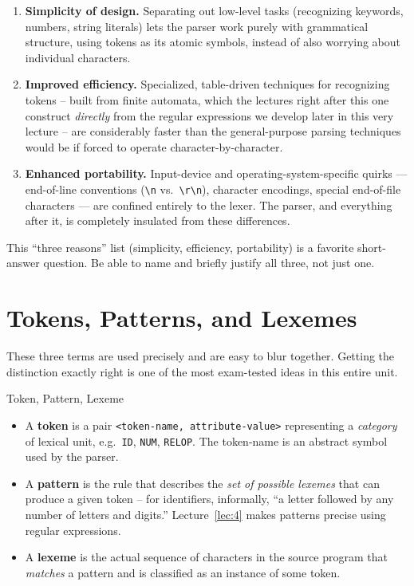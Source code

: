 \documentclass[full-course-notes.tex]{subfiles}
\begin{document}
\begin{enumerate}
  \item \textbf{Simplicity of design.} Separating out low-level tasks (recognizing keywords,
  numbers, string literals) lets the parser work purely with grammatical structure, using
  tokens as its atomic symbols, instead of also worrying about individual characters.
  \item \textbf{Improved efficiency.} Specialized, table-driven techniques for recognizing
  tokens -- built from finite automata, which the lectures right after this one construct
  \emph{directly} from the regular expressions we develop later in this very lecture -- are
  considerably faster than the general-purpose parsing techniques would be if forced to operate
  character-by-character.
  \item \textbf{Enhanced portability.} Input-device and operating-system-specific quirks ---
  end-of-line conventions (\texttt{\textbackslash n} vs.\ \texttt{\textbackslash r\textbackslash n}), character
  encodings, special end-of-file characters --- are confined entirely to the lexer. The parser,
  and everything after it, is completely insulated from these differences.
\end{enumerate}

\begin{examfocus}
This ``three reasons'' list (simplicity, efficiency, portability) is a favorite short-answer
question. Be able to name and briefly justify all three, not just one.
\end{examfocus}

\section{Tokens, Patterns, and Lexemes}
\label{sec:l3-tokens-patterns-lexemes}

\dbtag These three terms are used precisely and are easy to blur together. Getting the
distinction exactly right is one of the most exam-tested ideas in this entire unit.

\begin{defbox}{Token, Pattern, Lexeme}
\begin{itemize}
  \item A \textbf{token} is a pair \texttt{<token-name, attribute-value>} representing a
  \emph{category} of lexical unit, e.g.\ \texttt{ID}, \texttt{NUM}, \texttt{RELOP}. The
  token-name is an abstract symbol used by the parser.
  \item A \textbf{pattern} is the rule that describes the \emph{set of possible lexemes} that
  can produce a given token -- for identifiers, informally, ``a letter followed by any number of
  letters and digits.'' Lecture~\ref{lec:4} makes patterns precise using regular expressions.
  \item A \textbf{lexeme} is the actual sequence of characters in the source program that
  \emph{matches} a pattern and is classified as an instance of some token.
\end{itemize}
\end{defbox}
\end{document}
